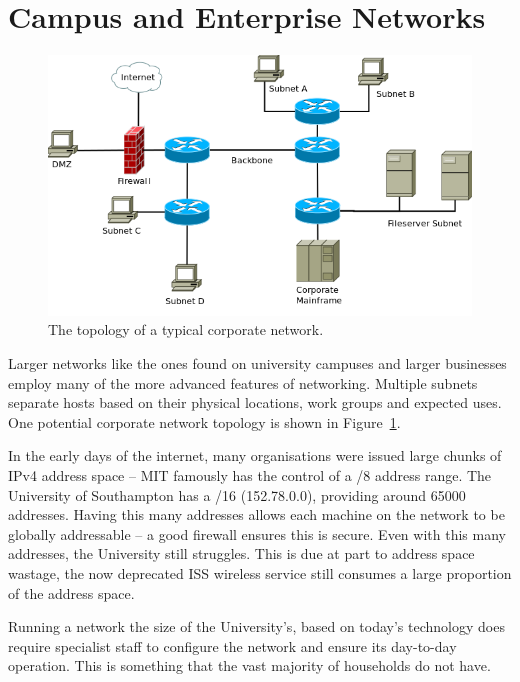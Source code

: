 \section{Campus and Enterprise Networks}
\begin{figure}
\begin{center}
	\includegraphics[width=\linewidth]{../Diagrams/Network/CorporateNetwork.png}
	\caption{The topology of a typical corporate network.}\label{fig:corporate_net}
\end{center}
\end{figure}
Larger networks like the ones found on university campuses and larger
businesses employ many of the more advanced features of networking.  Multiple
subnets separate hosts based on their physical locations, work groups and
expected uses. One potential corporate network topology is shown in
Figure~\ref{fig:corporate_net}.

In the early days of the internet, many organisations were issued large chunks
of IPv4 address space -- MIT famously has the control of a /8 address
range\cite{IPv4IANA}. The University of Southampton has a /16 (152.78.0.0),
providing around 65000 addresses. Having this many addresses allows each
machine on the network to be globally addressable -- a good firewall ensures
this is secure.  Even with this many addresses, the University still struggles.
This is due at part to address space wastage, the now deprecated ISS wireless
service still consumes a large proportion of the address space.

Running a network the size of the University's, based on today's technology
does require specialist staff to configure the network and ensure its
day-to-day operation. This is something that the vast majority of households do
not have.

